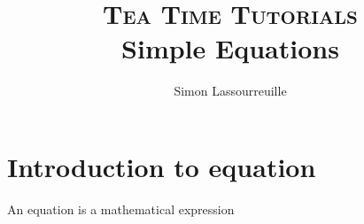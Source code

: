 \documentclass{article}
\title{%
    {\huge\textsc{Tea Time Tutorials}} \\
    Simple Equations
}
\author{
    Simon Lassourreuille
}
\date{}
\begin{document}
\maketitle

\section{Introduction to equation}

An equation is a mathematical expression 
\end{document}
